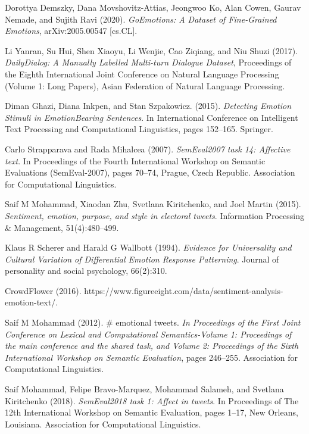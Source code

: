 \documentclass{article}
\begin{document}
\begin{thebibliography}{9}
Dorottya Demszky, Dana Movshovitz-Attias, Jeongwoo Ko, Alan Cowen, Gaurav Nemade, and Sujith Ravi (2020). \emph{GoEmotions: A Dataset of Fine-Grained Emotions}, arXiv:2005.00547 [cs.CL].

Li Yanran, Su Hui, Shen Xiaoyu, Li Wenjie, Cao Ziqiang, and Niu Shuzi (2017). \emph{DailyDialog: A Manually Labelled Multi-turn Dialogue Dataset}, Proceedings of the Eighth International Joint Conference on Natural Language Processing (Volume 1: Long Papers), Asian Federation of Natural Language Processing.

Diman Ghazi, Diana Inkpen, and Stan Szpakowicz.
(2015). \emph{Detecting Emotion Stimuli in EmotionBearing Sentences}. In International Conference on Intelligent Text Processing and Computational Linguistics, pages 152–165. Springer.

Carlo Strapparava and Rada Mihalcea (2007). \emph{SemEval2007 task 14: Affective text}. In Proceedings of the Fourth International Workshop on Semantic Evaluations (SemEval-2007), pages 70–74, Prague, Czech Republic. Association for Computational Linguistics.

Saif M Mohammad, Xiaodan Zhu, Svetlana Kiritchenko, and Joel Martin (2015). \emph{Sentiment, emotion, purpose, and style in electoral tweets}. Information Processing & Management, 51(4):480–499.

Klaus R Scherer and Harald G Wallbott (1994). \emph{Evidence for Universality and Cultural Variation of Differential Emotion Response Patterning}. Journal of personality and social psychology, 66(2):310.

CrowdFlower (2016). https://www.figureeight.com/data/sentiment-analysis-emotion-text/.

Saif M Mohammad (2012). \# emotional tweets. \emph{In Proceedings of the First Joint Conference on Lexical
and Computational Semantics-Volume 1: Proceedings of the main conference and the shared task, and
Volume 2: Proceedings of the Sixth International
Workshop on Semantic Evaluation}, pages 246–255.
Association for Computational Linguistics.

Saif Mohammad, Felipe Bravo-Marquez, Mohammad
Salameh, and Svetlana Kiritchenko (2018). \emph{SemEval2018 task 1: Affect in tweets}. In Proceedings of The 12th International Workshop on Semantic Evaluation, pages 1–17, New Orleans, Louisiana. Association for Computational Linguistics.


\end{thebibliography}
\end{document}
